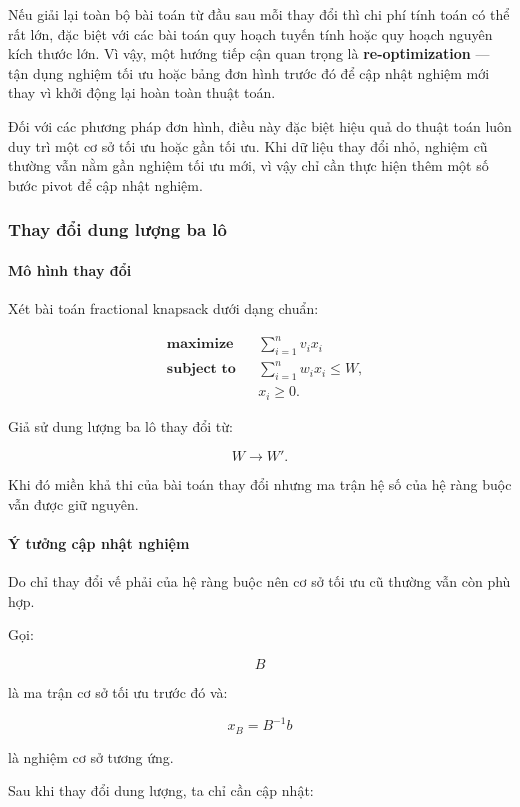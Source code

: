 \documentclass[fontsize=13pt,a4paper]{report}
\begin{document}
Nếu giải lại toàn bộ bài toán từ đầu sau mỗi thay đổi thì chi phí tính toán có thể rất lớn, đặc biệt với các bài toán quy hoạch tuyến tính hoặc quy hoạch nguyên kích thước lớn. Vì vậy, một hướng tiếp cận quan trọng là \textbf{re-optimization} --- tận dụng nghiệm tối ưu hoặc bảng đơn hình trước đó để cập nhật nghiệm mới thay vì khởi động lại hoàn toàn thuật toán.

Đối với các phương pháp đơn hình, điều này đặc biệt hiệu quả do thuật toán luôn duy trì một cơ sở tối ưu hoặc gần tối ưu. Khi dữ liệu thay đổi nhỏ, nghiệm cũ thường vẫn nằm gần nghiệm tối ưu mới, vì vậy chỉ cần thực hiện thêm một số bước pivot để cập nhật nghiệm.

\subsubsection{Thay đổi dung lượng ba lô}

\paragraph{Mô hình thay đổi}

Xét bài toán fractional knapsack dưới dạng chuẩn:

\[
\begin{aligned}
& \textbf{maximize} && \sum_{i=1}^{n} v_i x_i \\
& \textbf{subject\ to} && \sum_{i=1}^{n} w_i x_i \le W, \\
& && x_i \ge 0.
\end{aligned}
\]

Giả sử dung lượng ba lô thay đổi từ:

\[
W \rightarrow W'.
\]

Khi đó miền khả thi của bài toán thay đổi nhưng ma trận hệ số của hệ ràng buộc vẫn được giữ nguyên.

\paragraph{Ý tưởng cập nhật nghiệm}

Do chỉ thay đổi vế phải của hệ ràng buộc nên cơ sở tối ưu cũ thường vẫn còn phù hợp.

Gọi:

\[
B
\]

là ma trận cơ sở tối ưu trước đó và:

\[
x_B = B^{-1}b
\]

là nghiệm cơ sở tương ứng.

Sau khi thay đổi dung lượng, ta chỉ cần cập nhật:
\end{document}
